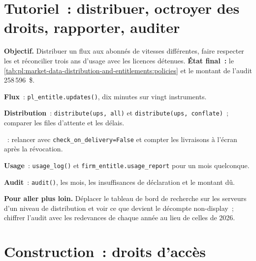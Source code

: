 \section{Tutoriel~: distribuer, octroyer des droits, rapporter, auditer}\label{tut:pl:market-data-distribution-and-entitlements:tut}

\begin{tutorial}
\textbf{Objectif.} Distribuer un flux aux abonnés de vitesses différentes, faire respecter les  et réconcilier trois ans d'usage avec les
licences détenues. \textbf{État final~:} le \cref{tab:pl:market-data-distribution-and-entitlements:policies} et le montant de l'audit
258\,596~\$.
\begin{tutsteps}
\item \textbf{Flux}~: \texttt{pl\_entitle.updates()}, dix minutes sur vingt instruments.
\item \textbf{Distribution}~: \texttt{distribute(ups, \textquotedbl all\textquotedbl)} et
\texttt{distribute(ups, \textquotedbl conflate\textquotedbl)}~; comparer les files d'attente et les délais.
\item \textbf{}~: relancer avec \texttt{check\_on\_delivery=False} et compter les livraisons à l'écran après la révocation.
\item \textbf{Usage}~: \texttt{usage\_log()} et \texttt{firm\_entitle.usage\_report} pour un mois quelconque.
\item \textbf{Audit}~: \texttt{audit()}, les mois, les insuffisances de déclaration et le montant dû.
\end{tutsteps}
\textbf{Pour aller plus loin.} Déplacer le tableau de bord de recherche sur les serveurs d'un niveau de distribution et voir ce que devient le décompte non-display~;
chiffrer l'audit avec les redevances de chaque année au lieu de celles de 2026.
\end{tutorial}

\section{Construction~: droits d'accès}\label{bld:pl:market-data-distribution-and-entitlements:entitle}

